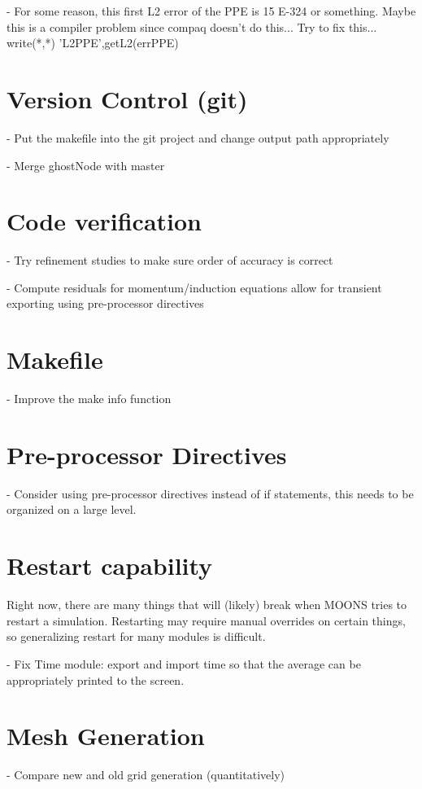 \documentclass[11pt]{article}
\begin{document}
- For some reason, this first L2 error of the PPE is
15 E-324 or something. Maybe this is a compiler problem
since compaq doesn't do this... Try to fix this...
write(*,*) 'L2PPE',getL2(errPPE)


\section{Version Control (git)}
- Put the makefile into the git project and change output path appropriately

- Merge ghostNode with master

\section{Code verification}

- Try refinement studies to make sure order of accuracy is correct

- Compute residuals for momentum/induction equations allow for transient exporting using pre-processor directives

\section{Makefile}
- Improve the make info function

\section{Pre-processor Directives}
- Consider using pre-processor directives instead of if statements, this needs to be organized on a large level.

\section{Restart capability}
Right now, there are many things that will (likely) break when MOONS tries to restart a simulation. Restarting may require manual overrides on certain things, so generalizing restart for many modules is difficult.

- Fix Time module: export and import time so that the average can be appropriately
printed to the screen.



\section{Mesh Generation}

- Compare new and old grid generation (quantitatively)
\end{document}
